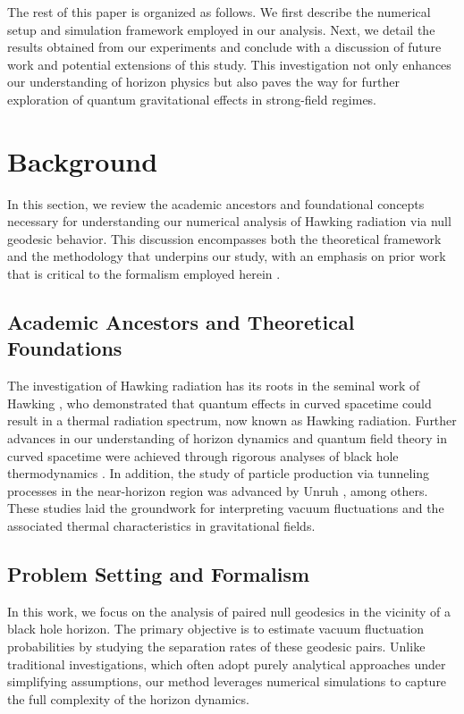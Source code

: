 \documentclass{article}\usepackage[utf8]{inputenc} %
\begin{document}
The rest of this paper is organized as follows. We first describe the numerical setup and simulation framework employed in our analysis. Next, we detail the results obtained from our experiments and conclude with a discussion of future work and potential extensions of this study. This investigation not only enhances our understanding of horizon physics but also paves the way for further exploration of quantum gravitational effects in strong-field regimes.

\section{Background}
In this section, we review the academic ancestors and foundational concepts necessary for understanding our numerical analysis of Hawking radiation via null geodesic behavior. This discussion encompasses both the theoretical framework and the methodology that underpins our study, with an emphasis on prior work that is critical to the formalism employed herein \cite{Hawking1975,Jacobson1993,Unruh1976}.

\subsection{Academic Ancestors and Theoretical Foundations}
The investigation of Hawking radiation has its roots in the seminal work of Hawking \cite{Hawking1975}, who demonstrated that quantum effects in curved spacetime could result in a thermal radiation spectrum, now known as Hawking radiation. Further advances in our understanding of horizon dynamics and quantum field theory in curved spacetime were achieved through rigorous analyses of black hole thermodynamics \cite{Jacobson1993}. In addition, the study of particle production via tunneling processes in the near-horizon region was advanced by Unruh \cite{Unruh1976}, among others. These studies laid the groundwork for interpreting vacuum fluctuations and the associated thermal characteristics in gravitational fields.

\subsection{Problem Setting and Formalism}
In this work, we focus on the analysis of paired null geodesics in the vicinity of a black hole horizon. The primary objective is to estimate vacuum fluctuation probabilities by studying the separation rates of these geodesic pairs. Unlike traditional investigations, which often adopt purely analytical approaches under simplifying assumptions, our method leverages numerical simulations to capture the full complexity of the horizon dynamics.
\end{document}
